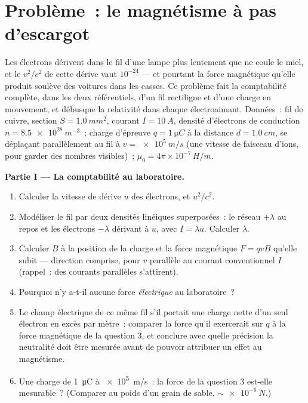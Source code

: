 \section{Problème~: le magnétisme à pas d'escargot}

\begin{problem}\label{pb:b3:covariant-electromagnetism:1}
Les électrons dérivent dans le fil d'une lampe plus lentement que ne
coule le miel, et le $v^2/c^2$ de cette dérive vaut $10^{-24}$ --- et
pourtant la force magnétique qu'elle produit soulève des voitures dans
les casses. Ce problème fait la comptabilité complète, dans les deux
référentiels, d'un fil rectiligne et d'une charge en mouvement, et
débusque la relativité dans chaque électroaimant. Données~: fil de
cuivre, section $S = \qty{1.0}{mm^2}$, courant $I = \qty{10}{A}$,
densité d'électrons de conduction $n = \qty{8.5e28}{m^{-3}}$~; charge
d'épreuve $q = \qty{1}{\micro C}$ à la distance $d = \qty{1.0}{cm}$, se
déplaçant parallèlement au fil à $v = \qty{e5}{m/s}$ (une vitesse de
faisceau d'ions, pour garder des nombres visibles)~;
$\mu_0 = 4\pi\times10^{-7}\,\unit{H/m}$.

\medskip\noindent\textbf{Partie I --- La comptabilité au laboratoire.}
\begin{enumerate}
  \item Calculer la vitesse de dérive $u$ des électrons, et $u^2/c^2$.
  \item Modéliser le fil par deux densités linéiques superposées~: le
        réseau $+\lambda$ au repos et les électrons $-\lambda$ dérivant
        à $u$, avec $I = \lambda u$. Calculer $\lambda$.
  \item Calculer $B$ à la position de la charge et la force magnétique
        $F = qvB$ qu'elle subit --- direction comprise, pour $v$
        parallèle au courant conventionnel $I$ (rappel~: des courants
        parallèles s'attirent).
  \item Pourquoi n'y a-t-il aucune force \emph{électrique} au
        laboratoire~?
  \item Le champ électrique de ce même fil s'il portait une charge
        nette d'un seul électron en excès par mètre~: comparer la force
        qu'il exercerait sur $q$ à la force magnétique de la question
        3, et conclure avec quelle précision la neutralité doit être
        mesurée avant de pouvoir attribuer un effet au magnétisme.
  \item Une charge de \qty{1}{\micro C} à \qty{e5}{m/s}~: la force de
        la question 3 est-elle mesurable~? (Comparer au poids d'un
        grain de sable, $\sim\qty{e-6}{N}$.)
\end{enumerate}


\end{problem}
